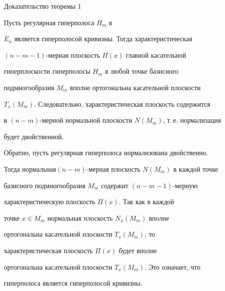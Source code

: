 \begin{pf*}{Доказательство теоремы 1}


Пусть регулярная гиперполоса $H_m$ в


$E_n$ является гиперполосой кривизны. Тогда характеристическая


$(n-m-1)$-мерная плоскость $\Pi(x)$ главной касательной


гиперплоскости гиперполосы $H_m$ в любой точке базисного


подмногообразия $M_m$ вполне ортогональна касательной плоскости


$T_x(M_m)$. Следовательно, характеристическая плоскость содержится


в $(n-m)$-мерной нормальной плоскости $N(M_m)$, т.\,е. нормализация


будет двойственной.





Обратно, пусть регулярная гиперполоса нормализована двойственно.


Тогда нормальная\linebreak $(n-m)$-мерная плоскость $N(M_m)$ в каждой точке


базисного подмногообразия $M_m$ содержит $(n-m-1)$-мерную


характеристическую плоскость $\Pi(x)$. Так как в каждой


точке $x\in M_m$ нормальная плоскость $N_x(M_m)$ вполне


ортогональна касательной плоскости $T_x(M_m)$, то


характеристическая плоскость $\Pi(x)$ будет вполне


ортогональна касательной плоскости $T_x(M_m)$. Это означает, что


гиперполоса является гиперполосой кривизны.


\end{pf*}





